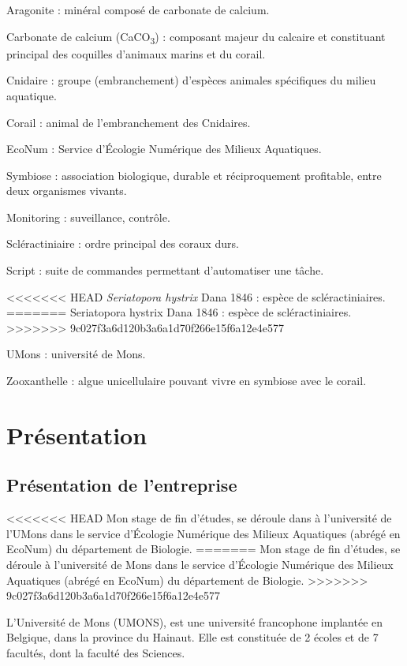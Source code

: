 \documentclass[]{report}
\begin{document}
\normalsize
Aragonite : minéral composé de carbonate de calcium.

Carbonate de calcium (CaCO\textsubscript{3}) : composant majeur du
calcaire et constituant principal des coquilles d'animaux marins et du
corail.

Cnidaire : groupe (embranchement) d'espèces animales spécifiques du
milieu aquatique.

Corail : animal de l'embranchement des Cnidaires.

EcoNum : Service d'Écologie Numérique des Milieux Aquatiques.

Symbiose : association biologique, durable et réciproquement profitable,
entre deux organismes vivants.

Monitoring : suveillance, contrôle.

Scléractiniaire : ordre principal des coraux durs.

Script : suite de commandes permettant d'automatiser une tâche.

<<<<<<< HEAD
\emph{Seriatopora hystrix} Dana 1846 : espèce de scléractiniaires.
=======
Seriatopora hystrix Dana 1846 : espèce de scléractiniaires.
>>>>>>> 9c027f3a6d120b3a6a1d70f266e15f6a12e4e577

UMons : université de Mons.

Zooxanthelle : algue unicellulaire pouvant vivre en symbiose avec le
corail.

\null
\newpage

\chapter{Présentation}\label{presentation}

\section{Présentation de
l'entreprise}\label{presentation-de-lentreprise}

<<<<<<< HEAD
Mon stage de fin d'études, se déroule dans à l'université de l'UMons
dans le service d'Écologie Numérique des Milieux Aquatiques (abrégé en
EcoNum) du département de Biologie.
=======
Mon stage de fin d'études, se déroule à l'université de Mons dans le
service d'Écologie Numérique des Milieux Aquatiques (abrégé en EcoNum)
du département de Biologie.
>>>>>>> 9c027f3a6d120b3a6a1d70f266e15f6a12e4e577

L'Université de Mons (UMONS), est une université francophone implantée
en Belgique, dans la province du Hainaut. Elle est constituée de 2
écoles et de 7 facultés, dont la faculté des Sciences.
\end{document}
